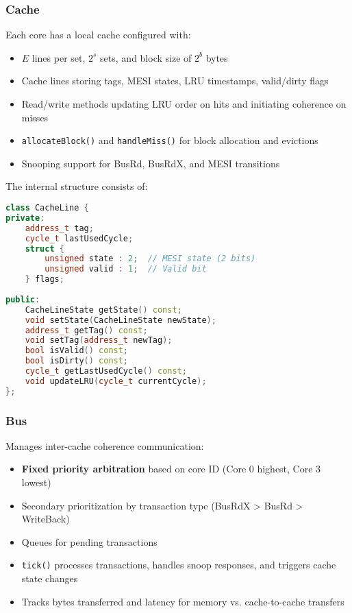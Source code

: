 \documentclass[11pt]{article}
\begin{document}
\subsubsection{Cache}
Each core has a local cache configured with:
\begin{itemize}
    \item $E$ lines per set, $2^s$ sets, and block size of $2^b$ bytes
    \item Cache lines storing tags, MESI states, LRU timestamps, valid/dirty flags
    \item Read/write methods updating LRU order on hits and initiating coherence on misses
    \item \texttt{allocateBlock()} and \texttt{handleMiss()} for block allocation and evictions
    \item Snooping support for BusRd, BusRdX, and MESI transitions
\end{itemize}

The internal structure consists of:

\begin{lstlisting}[language=C++, caption=Cache Line Structure]
class CacheLine {
private:
    address_t tag;
    cycle_t lastUsedCycle;
    struct {
        unsigned state : 2;  // MESI state (2 bits)
        unsigned valid : 1;  // Valid bit
    } flags;
    
public:
    CacheLineState getState() const;
    void setState(CacheLineState newState);
    address_t getTag() const;
    void setTag(address_t newTag);
    bool isValid() const;
    bool isDirty() const;
    cycle_t getLastUsedCycle() const;
    void updateLRU(cycle_t currentCycle);
};
\end{lstlisting}

\subsubsection{Bus}
Manages inter-cache coherence communication:
\begin{itemize}
    \item \textbf{Fixed priority arbitration} based on core ID (Core 0 highest, Core 3 lowest)
    \item Secondary prioritization by transaction type (BusRdX > BusRd > WriteBack)
    \item Queues for pending transactions
    \item \texttt{tick()} processes transactions, handles snoop responses, and triggers cache state changes
    \item Tracks bytes transferred and latency for memory vs. cache-to-cache transfers
\end{itemize}
\end{document}
